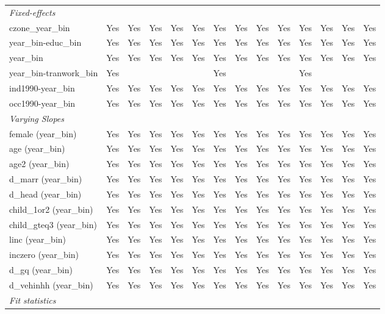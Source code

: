 \begin{tabular}{lccccccccccccc}
\midrule \emph{Fixed-effects}&   &   &   &   &   &   &   &   &   &   &   &   &  \\
czone\_year\_bin & Yes & Yes & Yes & Yes & Yes & Yes & Yes & Yes & Yes & Yes & Yes & Yes & Yes\\
year\_bin-educ\_bin & Yes & Yes & Yes & Yes & Yes & Yes & Yes & Yes & Yes & Yes & Yes & Yes & Yes\\
year\_bin & Yes & Yes & Yes & Yes & Yes & Yes & Yes & Yes & Yes & Yes & Yes & Yes & Yes\\
year\_bin-tranwork\_bin & Yes &  &  &  &  & Yes &  &  &  & Yes &  &  & \\
ind1990-year\_bin & Yes & Yes & Yes & Yes & Yes & Yes & Yes & Yes & Yes & Yes & Yes & Yes & Yes\\
occ1990-year\_bin & Yes & Yes & Yes & Yes & Yes & Yes & Yes & Yes & Yes & Yes & Yes & Yes & Yes\\
\midrule \emph{Varying Slopes}&   &   &   &   &   &   &   &   &   &   &   &   &  \\
female (year\_bin) & Yes & Yes & Yes & Yes & Yes & Yes & Yes & Yes & Yes & Yes & Yes & Yes & Yes\\
age (year\_bin) & Yes & Yes & Yes & Yes & Yes & Yes & Yes & Yes & Yes & Yes & Yes & Yes & Yes\\
age2 (year\_bin) & Yes & Yes & Yes & Yes & Yes & Yes & Yes & Yes & Yes & Yes & Yes & Yes & Yes\\
d\_marr (year\_bin) & Yes & Yes & Yes & Yes & Yes & Yes & Yes & Yes & Yes & Yes & Yes & Yes & Yes\\
d\_head (year\_bin) & Yes & Yes & Yes & Yes & Yes & Yes & Yes & Yes & Yes & Yes & Yes & Yes & Yes\\
child\_1or2 (year\_bin) & Yes & Yes & Yes & Yes & Yes & Yes & Yes & Yes & Yes & Yes & Yes & Yes & Yes\\
child\_gteq3 (year\_bin) & Yes & Yes & Yes & Yes & Yes & Yes & Yes & Yes & Yes & Yes & Yes & Yes & Yes\\
linc (year\_bin) & Yes & Yes & Yes & Yes & Yes & Yes & Yes & Yes & Yes & Yes & Yes & Yes & Yes\\
inczero (year\_bin) & Yes & Yes & Yes & Yes & Yes & Yes & Yes & Yes & Yes & Yes & Yes & Yes & Yes\\
d\_gq (year\_bin) & Yes & Yes & Yes & Yes & Yes & Yes & Yes & Yes & Yes & Yes & Yes & Yes & Yes\\
d\_vehinhh (year\_bin) & Yes & Yes & Yes & Yes & Yes & Yes & Yes & Yes & Yes & Yes & Yes & Yes & Yes\\
\midrule \emph{Fit statistics}&  & & & & & & & & & & & & \\

\end{tabular}
